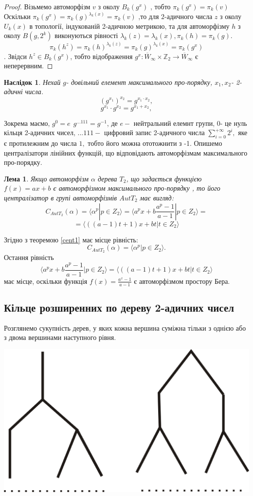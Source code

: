 \documentclass[a4paper,12pt]{article} \usepackage{a4wide}
\numberwithin{equation}{subsection}
\newtheorem{lemma}{Лема}[subsection]
\newtheorem{corollary}{Наслідок}[subsection]
\begin{document}
\begin{proof}
Візьмемо автоморфізм $ v$ з околу $ B_k(g^x)$ , тобто $\pi_k(g^x)=\pi_k(v)$
 Оскільки $\pi_k(g^x)=\pi_k(g)^{\lambda_k(x)}=\pi_k(v)$ ,то
 для $2$-адичного числа $z$ з околу $U_k(x)$ в топології, індукованій 2-адичною метрикою, та для автоморфізму $h$
 з околу $ B(g,2^k)$ виконуються рівності $\lambda_k(z)=\lambda_k(x),\pi_k(h)=\pi_k(g) $.
  \[ \pi_k(h^z)=\pi_k(h)^{\lambda_k(z)}=\pi_k(g)^{\lambda_k(x)}=\pi_k(g^x) \].
  Звідси $ h^z \in B_k(g^x)$, тобто відображення $g^x:\overline{W}_{\infty}\times \mathbb{Z}_2\rightarrow
  \overline{W}_{\infty} $
   є неперервним.
\end{proof}
\begin{corollary}
Нехай $ g$- довільний елемент максимального
  про-порядку, $x_1,x_2$- 2-адичні числа.
$$(g^{x_1})^{x_2}=g^{x_1\cdot x_2},$$
$$g^{x_1}\cdot g^{x_2}=g^{x_1+x_2}, $$
\end{corollary}
Зокрема маємо,  $g^0=e \ \ g^{...111} = g^{-1}$,  де $e-$ нейтральний елемнт групи,  0- це нуль кільця 2-адичних чисел,
$...111 -$ цифровий запис 2-адичного числа $\sum_{i=0}^{+\infty} 2^i,$ яке є протилежним до числа $1,$ тобто його можна
ототожнити з -1.
Опишемо централізатори лінійних функцій, що відповідають автоморфізмам максимального про-порядку.
\begin{lemma}\label{cent2}
Якщо автоморфізм $\alpha$ дерева $T_2$, що задається функцією $f(x)=ax+b$ є автоморфізмом максимального про-порядку , то його централізатор в групі автоморфізмів $AutT_2$ має вигляд:
$$C_{AutT_2}(\alpha)=\langle \alpha^p|p\in Z_2\rangle=\langle a^px+b\frac{a^p-1}{a-1}|p\in Z_2\rangle=$$ $$=\langle ((a-1)t+1)x+bt|t\in Z_2\rangle$$
\end{lemma}
Згідно з теоремою \ref{cent1} має місце рівність:$$C_{AutT_2}(\alpha)=\langle \alpha^p|p\in Z_2\rangle.$$
Остання рівність $$ \langle a^px+b\frac{a^p-1}{a-1}|p\in Z_2\rangle=\langle ((a-1)t+1)x+bt|t\in Z_2\rangle$$ має місце, оскільки функція $f(x)=\frac{a^x-1}{a-1}$ є автоморфізмом простору Бера.

\subsection{Кільце розширенних по дереву 2-адичних чисел}
Розглянемо сукупність дерев, у яких кожна вершина суміжна тільки з однією або з двома вершинами наступного рівня.

\begin{center}
\includegraphics[scale=0.3]{RingTr.eps}
\end{center}
\end{document}
